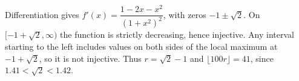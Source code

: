 Differentiation gives $f\prime(x)=\dfrac{1-2x-x^2}{(1+x^2)^2}$, with zeros $-1\pm\sqrt2$. On $[-1+\sqrt2,\infty)$ the function is strictly decreasing, hence injective. Any interval starting to the left includes values on both sides of the local maximum at $-1+\sqrt2$, so it is not injective. Thus $r=\sqrt2-1$ and $\boxed{\lfloor100r\rfloor=41}$, since $1.41<\sqrt2<1.42$.

